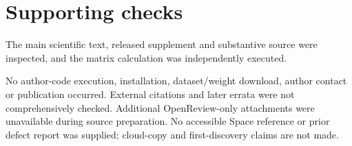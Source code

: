 \documentclass[10pt]{article}
\begin{document}
\section*{Supporting checks}
The main scientific text, released supplement and substantive source were inspected, and the matrix calculation was independently executed.\par
No author-code execution, installation, dataset/weight download, author contact or publication occurred. External citations and later errata were not comprehensively checked. Additional OpenReview-only attachments were unavailable during source preparation. No accessible Space reference or prior defect report was supplied; cloud-copy and first-discovery claims are not made.\par
\end{document}
